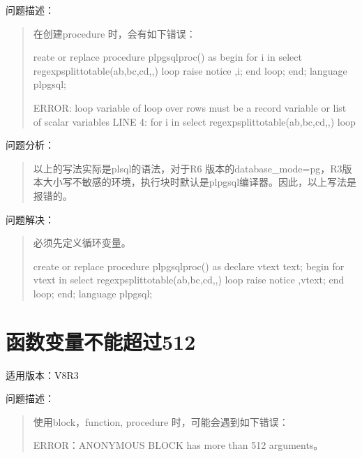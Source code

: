 \documentclass[letterpaper,10pt,english]{sphinxmanual}
\begin{document}
问题描述：
\begin{quote}

在创建procedure 时，会有如下错误：

\begin{sphinxVerbatim}[commandchars=\\\{\}]
reate or replace procedure plpgsql\PYGZus{}proc() as
\PYGZdl{}\PYGZdl{}
begin
  for i in select regexp\PYGZus{}split\PYGZus{}to\PYGZus{}table(\PYGZsq{}ab,bc,cd\PYGZsq{},\PYGZsq{},\PYGZsq{}) loop
    raise notice \PYGZsq{}\PYGZpc{}\PYGZsq{},i;
  end loop;
end;
\PYGZdl{}\PYGZdl{} language plpgsql;

ERROR:  loop variable of loop over rows must be a record variable or list of scalar variables
LINE 4:   for i in select regexp\PYGZus{}split\PYGZus{}to\PYGZus{}table(\PYGZsq{}ab,bc,cd\PYGZsq{},\PYGZsq{},\PYGZsq{}) loop
\end{sphinxVerbatim}
\end{quote}

问题分析：
\begin{quote}

以上的写法实际是plsql的语法，对于R6 版本的database\_mode=pg，R3版本大小写不敏感的环境，执行块时默认是plpgsql编译器。因此，以上写法是报错的。
\end{quote}

问题解决：
\begin{quote}

必须先定义循环变量。

\begin{sphinxVerbatim}[commandchars=\\\{\}]
create or replace procedure plpgsql\PYGZus{}proc() as
\PYGZdl{}\PYGZdl{}
declare
  v\PYGZus{}text text;
begin
  for v\PYGZus{}text in select regexp\PYGZus{}split\PYGZus{}to\PYGZus{}table(\PYGZsq{}ab,bc,cd\PYGZsq{},\PYGZsq{},\PYGZsq{}) loop
    raise notice \PYGZsq{}\PYGZpc{}\PYGZsq{},v\PYGZus{}text;
  end loop;
end;
\PYGZdl{}\PYGZdl{} language plpgsql;
\end{sphinxVerbatim}
\end{quote}


\section{函数变量不能超过512}
\label{\detokenize{plsql:id1}}
适用版本：V8R3

问题描述：
\begin{quote}

使用block，function, procedure 时，可能会遇到如下错误：

\begin{sphinxVerbatim}[commandchars=\\\{\}]
ERROR：ANONYMOUS BLOCK has more than 512 arguments。
\end{sphinxVerbatim}
\end{quote}
\end{document}
